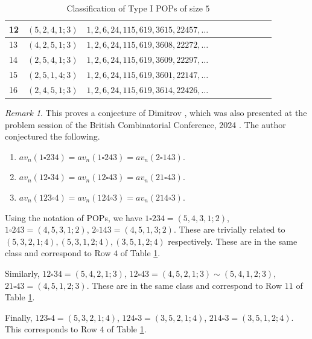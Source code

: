 \documentclass[12pt, english, a4paper]{article}
\newcommand{\blue}[1]{\textcolor{blue}{#1}}
\newcommand{\red}[1]{\textcolor{red}{#1}}
\newcommand{\sq}{\square}
\theoremstyle{plain}
\theoremstyle{definition}
\theoremstyle{remark}
\newtheorem{remark}[theorem]{Remark}
\begin{document}
\begin{table}[!htbp]
\begin{tabular}{|l|l|l|l|l|l|l|l|l|l|}
\hline
12 & $(5,2,4,1;3)$& $1,2,6,24, 115, 619, 3615, 22457,\ldots$&\\

\hline
13 & $(4,2,5,1;3)$& $1,2,6,24, 115, 619, 3608, 22272 ,\ldots$&\\
\hline
14 & $(2,5,4,1;3)$& $1,2,6,24, 115, 619, 3609, 22297,\ldots$&\\

\hline
15 & $(2,5,1,4;3)$& $1,2,6,24,  115, 619, 3601, 22147,\ldots$&\\
\hline

16 & $(2,4,5,1;3)$& $1,2,6,24, 115, 619, 3614, 22426,\ldots$&\\



\hline

\end{tabular}
\caption{Classification of Type I POPs of size $5$ }
\label{table3}
\end{table}
\begin{remark}
        This proves a conjecture of Dimitrov \cite[Conjecture 8.1]{stoyan-distant-pattern}, which was also presented at the problem session of the British Combinatorial Conference, 2024 \cite{cameron-bcc30}. 
The author conjectured the following.
\begin{enumerate}
    \item \label{conj1}$av_n(1\sq 234)=av_n(1\sq243)=av_n(2\sq143)$.
    \item \label{conj2} $av_n(12\sq34)=av_n(12\sq43)=av_n(21\sq43)$.
    \item \label{conj3} $av_n(123\sq4)=av_n(124\sq3)=av_n(214\sq3)$.
\end{enumerate}
 Using the notation of POPs, we have $1\sq 234=(5,4,3,1;2) $, $1\sq243=(4,5,3,1;2)$, $2\sq 143=(4,5,1,3;2)$. These are trivially related to $(5,3,2,1;4), (5,3,1,2;4), (3,5,1,2;4)$ respectively. These are in the same class and correspond to Row $4$ of Table \ref{table3}.
 
 Similarly, $12\sq34=(5,4,2,1;3)$, $12\sq43=(4,5,2,1;3)\sim (5,4,1,2;3)$, $21\sq43=(4,5,1,2;3)$. These are in the same class and correspond to Row $11$ of Table \ref{table3}.
 
 Finally, $123\sq4=(5,3,2,1;4)$, $124\sq3=(3,5,2,1;4)$, $214\sq3=(3,5,1,2;4)$. This corresponds to Row $4$ of Table \ref{table3}.  
\end{remark}
    
\end{document}
